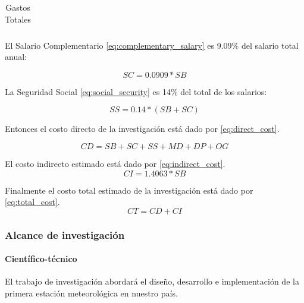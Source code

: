 \documentclass[12pt,letterpaper]{article}
\begin{document}
\begin{sloppypar}
\begin{table}[htpb]
\begin{tabularx}{\columnwidth}{|XX|}
                \hline
            \end{tabularx}\label{tab:table}
            \caption{Gastos Totales}
            \label{tab:finantial_resources}
        \end{table}

        El Salario Complementario \ref{eq:complementary_salary} es 9.09\% del salario
        total anual:

        \begin{equation}
            \label{eq:complementary_salary} SC=0.0909*SB
        \end{equation}

        La Seguridad Social \ref{eq:social_security} es 14\% del total de los salarios:

        \begin{equation}
            \label{eq:social_security} SS=0.14*(SB+SC)
        \end{equation}

        Entonces el costo directo de la investigación está dado por
        \ref{eq:direct_cost}.

        \begin{equation}
            \label{eq:direct_cost}
            CD=SB+SC+SS+MD+DP+OG
        \end{equation}

        El costo indirecto estimado está dado por \ref{eq:indirect_cost}.
        \begin{equation}
            \label{eq:indirect_cost}
            CI=1.4063*SB
        \end{equation}

        Finalmente el costo total estimado de la investigación está dado por
        \ref{eq:total_cost}.
        \begin{equation}
            \label{eq:total_cost}
            CT=CD+CI
        \end{equation}

        \subsubsection{Alcance de investigación}\label{subsec:alcance-de-investigacion}

        \paragraph*{Científico-técnico}
        El trabajo de investigación abordará el diseño, desarrollo e implementación de
        la primera estación meteorológica
        en nuestro país.


\end{sloppypar}
\end{document}
